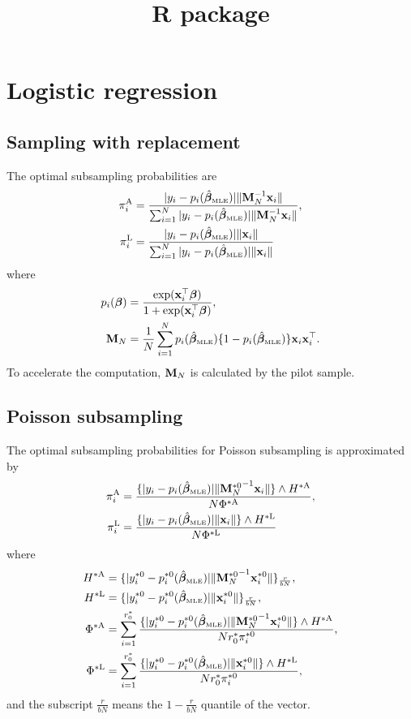 \documentclass[letterpaper,12pt,hidelinks]{article}
\title{R package}
\author{}
\date{}
\begin{document}
\maketitle

\section{Logistic regression}

\subsection{Sampling with replacement}

The optimal subsampling probabilities are
\begin{align*}
    \pi_i^{\mathrm{A}} &= \frac{|y_i - p_i(\hat{\boldsymbol{\beta}}_{\textnormal{\tiny MLE}})|\|\mathbf{M}_N^{-1}\mathbf{x}_i\|}{\sum_{i=1}^{N} |y_i - p_i(\hat{\boldsymbol{\beta}}_{\textnormal{\tiny MLE}})|\|\mathbf{M}_N^{-1}\mathbf{x}_i\|}, \\
    \pi_i^{\mathrm{L}} &= \frac{|y_i - p_i(\hat{\boldsymbol{\beta}}_{\textnormal{\tiny MLE}})|\|\mathbf{x}_i\|}{\sum_{i=1}^{N} |y_i - p_i(\hat{\boldsymbol{\beta}}_{\textnormal{\tiny MLE}})|\|\mathbf{x}_i\|}\\
\end{align*}
where
\begin{align*}
    p_i(\boldsymbol{\beta}) &= \frac{\exp(\mathbf{x}_i^{\top} \boldsymbol{\beta})}{1 + \exp(\mathbf{x}_i^{\top} \boldsymbol{\beta})}, \\
    \mathbf{M}_N &= \frac{1}{N} \sum_{i=1}^{N} p_i(\hat{\boldsymbol{\beta}}_{\textnormal{\tiny MLE}})\{1 - p_i(\hat{\boldsymbol{\beta}}_{\textnormal{\tiny MLE}})\} \mathbf{x}_i\mathbf{x}_i^{\top}.
\end{align*}
To accelerate the computation, $\mathbf{M}_N$ is calculated by the pilot sample.

\subsection{Poisson subsampling}

The optimal subsampling probabilities for Poisson subsampling is approximated by
\begin{align*}
    \pi_i^{\mathrm{A}} &= \frac{\{|y_i - p_i(\hat{\boldsymbol{\beta}}_{\textnormal{\tiny MLE}})|\|{\mathbf{M}_N^{*0}}^{-1}\mathbf{x}_i\|\}\wedge H^{*{\mathrm{A}}}}{N\Phi^{*{\mathrm{A}}}} ,\\
    \pi_i^{\mathrm{L}} &= \frac{\{|y_i - p_i(\hat{\boldsymbol{\beta}}_{\textnormal{\tiny MLE}})|\|\mathbf{x}_i\|\} \wedge H^{*{\mathrm{L}}}}{N\Phi^{*{\mathrm{L}}}}
\end{align*}
where
\begin{align*}
    H^{*{\mathrm{A}}} &= \{|y_i^{*0} - p_i^{*0}(\hat{\boldsymbol{\beta}}_{\textnormal{\tiny MLE}})|\|{\mathbf{M}_N^{*0}}^{-1}\mathbf{x}_i^{*0}\|\}_{\frac{r}{bN}}, \\
    H^{*{\mathrm{L}}} &= \{|y_i^{*0} - p_i^{*0}(\hat{\boldsymbol{\beta}}_{\textnormal{\tiny MLE}})|\|\mathbf{x}_i^{*0}\|\}_{\frac{r}{bN}}, \\
    \Phi^{*{\mathrm{A}}} &= \sum_{i=1}^{r_0^*} \frac{\{|y_i^{*0} - p_i^{*0}(\hat{\boldsymbol{\beta}}_{\textnormal{\tiny MLE}})|\|{\mathbf{M}_N^{*0}}^{-1}\mathbf{x}_i^{*0}\|\} \wedge H^{*{\mathrm{A}}}}{N r_0^* \pi_i^{*0}}, \\
    \Phi^{*{\mathrm{L}}} &= \sum_{i=1}^{r_0^*} \frac{\{|y_i^{*0} - p_i^{*0}(\hat{\boldsymbol{\beta}}_{\textnormal{\tiny MLE}})|\|\mathbf{x}_i^{*0}\|\} \wedge H^{*{\mathrm{L}}}}{N r_0^* \pi_i^{*0}},
\end{align*}
and the subscript $\frac{r}{bN}$ means the $1 - \frac{r}{bN}$ quantile of the vector.
\end{document}
